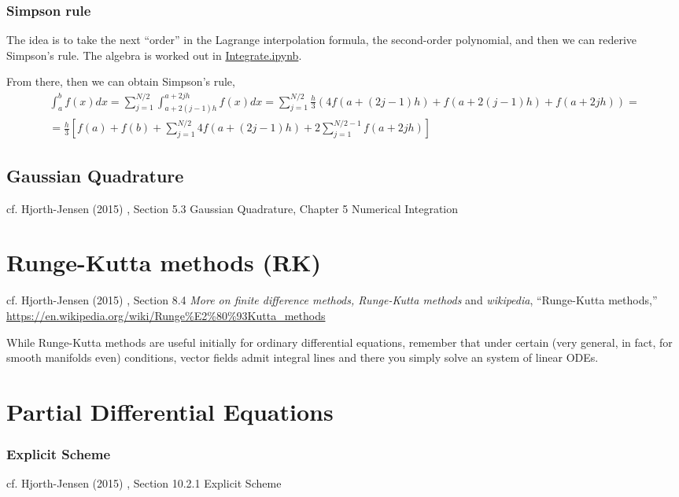 \documentclass[10pt]{amsart}
\begin{document}
\begin{multicols*}{2}
\subsubsection{Simpson rule}

The idea is to take the next ``order'' in the Lagrange interpolation formula, the second-order polynomial, and then we can rederive Simpson's rule.  The algebra is worked out in \href{https://github.com/ernestyalumni/CompPhys/blob/master/Cpp/Integrate.ipynb}{Integrate.ipynb}.

From there, then we can obtain Simpson's rule,
\[
\begin{gathered}
  \int_a^b f(x)dx = \sum_{j=1}^{N/2} \int_{a + 2(j-1)h }^{a+2jh} f(x) dx = \sum_{j=1}^{N/2} \frac{h}{3} ( 4 f(a+(2j-1)h ) + f(a+2(j-1)h) + f(a+2jh) ) = \\
  = \frac{h}{3} \left[ f(a) + f(b) + \sum_{j=1}^{N/2} 4f(a+(2j-1) h) + 2\sum_{j=1}^{N/2-1} f(a+2jh) \right]
\end{gathered}
\]

\subsection{Gaussian Quadrature}

cf. Hjorth-Jensen (2015) \cite{Hjor2015}, Section 5.3 Gaussian Quadrature, Chapter 5 Numerical Integration


\section{Runge-Kutta methods (RK) }

cf. Hjorth-Jensen (2015) \cite{Hjor2015}, Section 8.4 \emph{More on finite difference methods, Runge-Kutta methods} and \emph{wikipedia}, ``Runge-Kutta methods,'' \url{https://en.wikipedia.org/wiki/Runge\%E2\%80\%93Kutta_methods}

While Runge-Kutta methods are useful initially for ordinary differential equations, remember that under certain (very general, in fact, for smooth manifolds even) conditions, vector fields admit integral lines and there you simply solve an system of linear ODEs.  


\section{Partial Differential Equations}

\subsubsection{Explicit Scheme}
cf. Hjorth-Jensen (2015) \cite{Hjor2015}, Section 10.2.1 Explicit Scheme


\end{multicols*}
\end{document}
